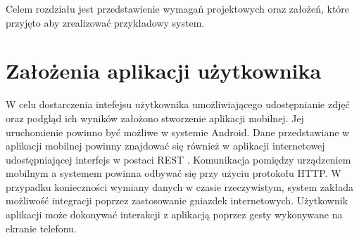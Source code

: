 Celem rozdziału jest przedstawienie wymagań projektowych oraz założeń, które przyjęto aby zrealizować przykładowy system. 

\section{Założenia aplikacji użytkownika}{
W celu dostarczenia intefejsu użytkownika umożliwiającego udostępnianie zdjęć oraz podgląd ich wyników założono stworzenie aplikacji mobilnej. Jej uruchomienie powinno być możliwe w systemie Android. Dane przedstawiane w aplikacji mobilnej powinny znajdować się również w aplikacji internetowej udostępniającej interfejs w postaci REST \cite{REST}. Komunikacja pomiędzy urządzeniem mobilnym a systemem powinna odbywać się przy użyciu protokołu HTTP. W przypadku konieczności wymiany danych w czasie rzeczywistym, system zakłada możliwość integracji poprzez zastosowanie gniazdek internetowych. Użytkownik aplikacji może dokonywać interakcji z aplikacją poprzez gesty wykonywane na ekranie telefonu. 
}

